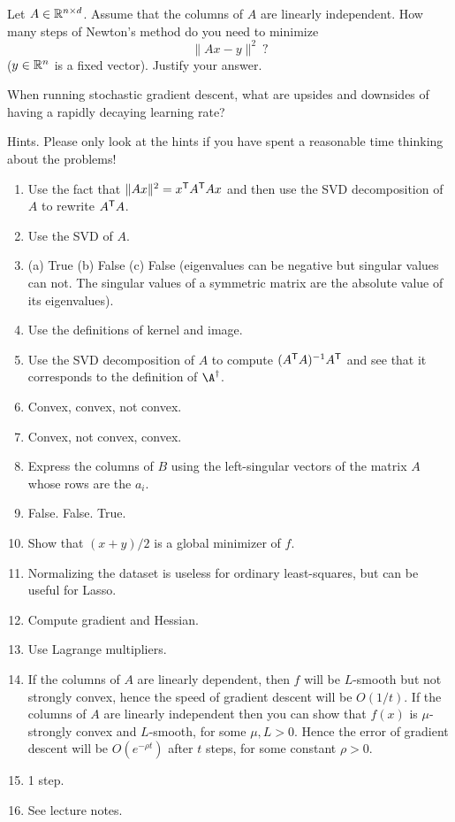 \documentclass[11pt,nocut]{article}
\begin{document}
\begin{problem}
	Let $A \in \mathbb{R}^{n \times d}$. Assume that the columns of $A$ are linearly independent. How many steps of Newton's method do you need to minimize
	$$
	\|Ax - y\|^2 \ ?
	$$
	($y \in \mathbb{R}^n$ is a fixed vector). Justify your answer.
\end{problem}


\begin{problem}
	When running stochastic gradient descent, what are upsides and downsides of having a rapidly decaying learning rate?
\end{problem}

\newpage

\begin{center}
	{\Large
	Hints. Please only look at the hints if you have spent a reasonable time thinking about the problems!
	}
\end{center}
\begin{enumerate}
	\item Use the fact that $\|Ax\|^2 = x^{{\sf T}} A^{{\sf T}} A x$ and then use the SVD decomposition of $A$ to rewrite $A^{{\sf T}} A$.
	\item Use the SVD of $A$.
	\item (a) True (b) False (c) False (eigenvalues can be negative but singular values can not. The singular values of a symmetric matrix are the absolute value of its eigenvalues).
	\item Use the definitions of kernel and image.
	\item Use the SVD decomposition of $A$ to compute $(A^{{\sf T}}A)^{-1}A^{{\sf T}}$ and see that it corresponds to the definition of $\A^{\dagger}$.
	\item Convex, convex, not convex.
	\item Convex, not convex, convex.
	\item Express the columns of $B$ using the left-singular vectors of the matrix $A$ whose rows are the $a_i$.
	\item False. False. True.
	\item Show that $(x+y)/2$ is a global minimizer of $f$.
	\item Normalizing the dataset is useless for ordinary least-squares, but can be useful for Lasso.
	\item Compute gradient and Hessian. 
	\item Use Lagrange multipliers.
	\item If the columns of $A$ are linearly dependent, then $f$ will be $L$-smooth but not strongly convex, hence the speed of gradient descent will be $O(1/t)$.
		If the columns of $A$ are linearly independent then you can show that $f(x)$ is $\mu$-strongly convex and $L$-smooth, for some $\mu,L>0$. Hence the error of gradient descent will be $O(e^{-\rho t})$ after $t$ steps, for some constant $\rho>0$. 
	\item 1 step.
	\item See lecture notes.
\end{enumerate}

\vspace{1cm}
\centerline{}

%
%
\end{document}
